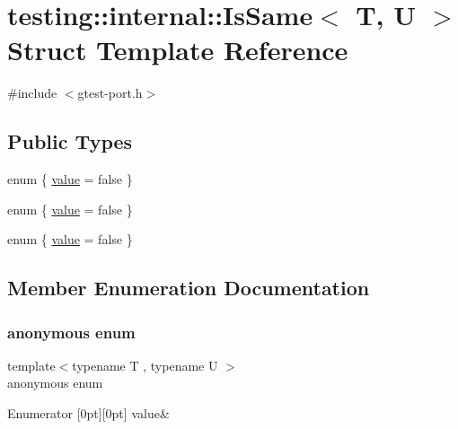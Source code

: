 \hypertarget{structtesting_1_1internal_1_1_is_same}{}\section{testing\+::internal\+::Is\+Same$<$ T, U $>$ Struct Template Reference}
\label{structtesting_1_1internal_1_1_is_same}


{\ttfamily \#include $<$gtest-\/port.\+h$>$}

\subsection*{Public Types}
\begin{DoxyCompactItemize}
\item 
enum \{ \mbox{\hyperlink{structtesting_1_1internal_1_1_is_same_a7b70487ca58f7865916972449e94defaaf3e815b266cfc5a9f664a9351cc74f29}{value}} = false
 \}
\item 
enum \{ \mbox{\hyperlink{structtesting_1_1internal_1_1_is_same_a7b70487ca58f7865916972449e94defaaf3e815b266cfc5a9f664a9351cc74f29}{value}} = false
 \}
\item 
enum \{ \mbox{\hyperlink{structtesting_1_1internal_1_1_is_same_a7b70487ca58f7865916972449e94defaaf3e815b266cfc5a9f664a9351cc74f29}{value}} = false
 \}
\end{DoxyCompactItemize}


\subsection{Member Enumeration Documentation}
\mbox{\label{structtesting_1_1internal_1_1_is_same_a2882c6b86e5b414c12c87e476d25ba9d}} 
\subsubsection{\texorpdfstring{anonymous enum}{anonymous enum}}
{\footnotesize\ttfamily template$<$typename T , typename U $>$ \\
anonymous enum}

\begin{DoxyEnumFields}{Enumerator}
[0pt][0pt]{}\mbox{\label{structtesting_1_1internal_1_1_is_same_a7b70487ca58f7865916972449e94defaaf3e815b266cfc5a9f664a9351cc74f29}} 
value&\\
\hline

\end{DoxyEnumFields}
\mbox{\label{structtesting_1_1internal_1_1_is_same_a7b70487ca58f7865916972449e94defa}} 
